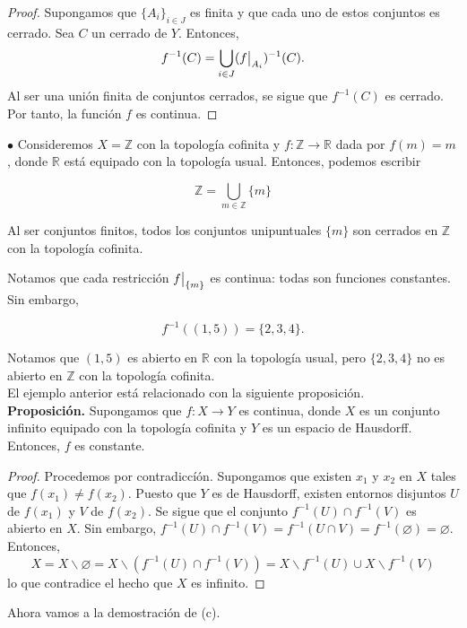 \documentclass{article}
\newcommand\restr[2]{{%
		\left.\kern-\nulldelimiterspace %
		#1 %
		\vphantom{\big|} %
		\right|_{#2} %
}}
\begin{document}
\begin{proof}
	Supongamos que $\{ A_{i} \}_{i \in J}$ es finita y que cada uno de estos conjuntos es cerrado. Sea $C$ un cerrado de $Y$. Entonces, 
	$$ f^{-1}(C) = \bigcup_{i \in J} ( \restr{f}{A_{i}} )^{-1}(C) .$$
	Al ser una unión finita de conjuntos cerrados, se sigue que $f^{-1}(C)$ es cerrado. Por tanto, la función $f$ es continua.
\end{proof}

$\bullet$ Consideremos $X = \mathbb{Z}$ con la topología cofinita  y $f: \mathbb{Z} \rightarrow \mathbb{R}$ dada por $f(m) = m$, donde $\mathbb{R}$ está equipado con la topología usual. Entonces, podemos escribir

$$ \mathbb{Z} = \bigcup_{m \in \mathbb{Z}} \{ m \} $$

Al ser conjuntos finitos, todos los conjuntos unipuntuales $\{m \}$ son cerrados en $\mathbb{Z}$ con la topología cofinita.

Notamos que cada restricción $\restr{f}{\{m \}}$ es continua: todas son funciones constantes. Sin embargo, 

$$ f^{-1}((1, 5)) = \{ 2, 3, 4 \}.$$

Notamos que $(1, 5)$ es abierto en $\mathbb{R}$ con la topología usual, pero $\{ 2, 3, 4 \}$ no es abierto en $\mathbb{Z}$ con la topología cofinita. \\

El ejemplo anterior está relacionado con la siguiente proposición. \\

\textbf{Proposición. } Supongamos que $f:X \rightarrow Y$ es continua, donde $X$ es un conjunto infinito equipado con la topología cofinita y $Y$ es un espacio de Hausdorff. Entonces, $f$ es constante. 
\begin{proof}
Procedemos por contradiccíón. Supongamos que existen $x_{1}$ y $x_{2}$ en $X$ tales que $f(x_{1}) \neq f(x_{2})$. Puesto que $Y$ es de Hausdorff, existen entornos disjuntos $U$ de $f(x_{1})$ y $V$ de $f(x_{2})$. Se sigue que el conjunto $f^{-1}(U) \cap f^{-1}(V)$ es abierto en $X$. Sin embargo, $f^{-1}(U) \cap f^{-1}(V) =f^{-1}(U \cap V) = f^{-1}(\varnothing) = \varnothing  $.  Entonces,
$$ X = X \backslash \varnothing = X \backslash (f^{-1}(U) \cap f^{-1}(V)) = X \backslash f^{-1}(U) \cup X \backslash f^{-1}(V)$$ 
lo que contradice el hecho que $X$ es infinito. 
\end{proof}

Ahora vamos a la demostración de (c).
\end{document}

